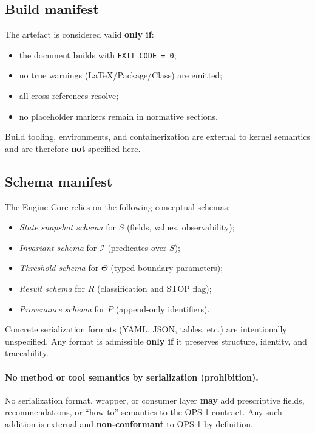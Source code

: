\subsection{Build manifest}

The artefact is considered valid \textbf{only if}:
\begin{itemize}
  \item the document builds with \texttt{EXIT\_CODE = 0};
  \item no true warnings (LaTeX/Package/Class) are emitted;
  \item all cross-references resolve;
  \item no placeholder markers remain in normative sections.
\end{itemize}

Build tooling, environments,
and containerization are external
to kernel semantics
and are therefore \textbf{not} specified here.

\subsection{Schema manifest}

The Engine Core relies on the following conceptual schemas:
\begin{itemize}
  \item \emph{State snapshot schema} for $S$
        (fields, values, observability);
  \item \emph{Invariant schema} for $\mathcal{I}$
        (predicates over $S$);
  \item \emph{Threshold schema} for $\Theta$
        (typed boundary parameters);
  \item \emph{Result schema} for $R$
        (classification and STOP flag);
  \item \emph{Provenance schema} for $P$
        (append-only identifiers).
\end{itemize}

Concrete serialization formats
(YAML, JSON, tables, etc.)
are intentionally unspecified.
Any format is admissible
\textbf{only if} it preserves
structure, identity,
and traceability.

\paragraph{No method or tool semantics by serialization (prohibition).}
No serialization format,
wrapper,
or consumer layer
\textbf{may} add prescriptive fields,
recommendations,
or ``how-to'' semantics
to the OPS-1 contract.
Any such addition is external
and \textbf{non-conformant}
to OPS-1 by definition.
